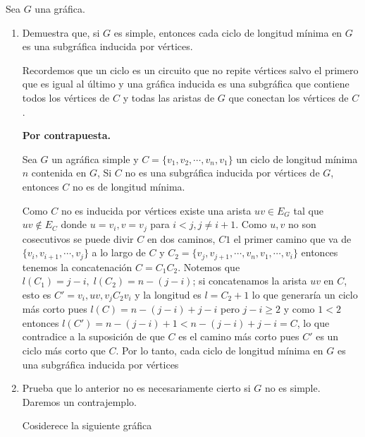 Sea $G$ una gráfica.
\begin{enumerate}
    \item Demuestra que, si $G$ es simple, entonces cada ciclo de longitud mínima en $G$ es una subgráfica inducida por vértices.

          Recordemos que un ciclo es un circuito que no repite vértices salvo el primero que es igual al último y una gráfica inducida es una subgráfica que contiene todos los vértices de $C$ y todas las aristas de $G$ que conectan los vértices de $C$.

          \textbf{Por contrapuesta.}

          Sea $G$ un agráfica simple y $C=\{v_1,v_2,\cdots,v_n,v_1\}$ un ciclo de longitud mínima $n$ contenida en $G$, Si $C$ no es una subgráfica inducida por vértices de $G$, entonces $C$ no es de longitud mínima.
          
           Como $C$ no es inducida por vértices existe una arista $uv\in E_G$ tal que $uv\notin E_C$ donde $u=v_i, v=v_j$ para $i<j,j\neq i+1$. Como $u,v$ no son cosecutivos se puede divir $C$ en dos caminos, $C1$ el primer camino que va de $\{v_i,v_{i+1},\cdots,v_j\}$ a lo largo de $C$ y $C_2=\{v_j,v_{j+1},\cdots,v_n,v_1,\cdots,v_i\}$ entonces tenemos la concatenación $C=C_1C_2$.  Notemos que $l(C_1)=j-i,\;l(C_2)=n-(j-i)$; si concatenamos la arista $uv$ en $C$, esto es $C'=v_i,uv,v_jC_2v_i$ y la longitud es $l=C_2+1$ lo que generaría un ciclo más corto pues $l(C)=n-(j-i)+j-i$ pero $j-i\geq2$ y como $1<2$ entonces $l(C')=n-(j-i)+1<n-(j-i)+j-i=C$, lo que contradice a la suposición de que $C$ es el camino más corto pues $C'$ es un ciclo más corto que $C$.
          Por lo tanto, cada ciclo de longitud mínima en $G$ es una subgráfica inducida por vértices

    \item Prueba que lo anterior no es necesariamente cierto si $G$ no es simple.
          Daremos un contrajemplo.

          Cosiderece la siguiente gráfica
          \begin{figure}[!hbt]
              \begin{center}
\end{center}
\end{figure}
\end{enumerate}
